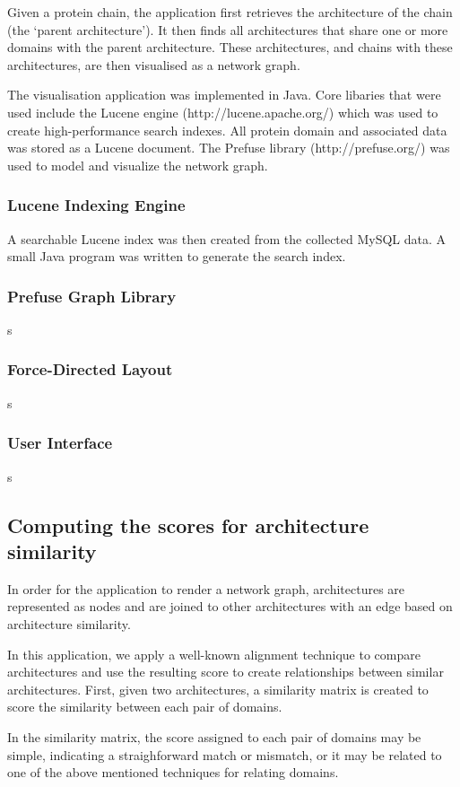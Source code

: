 Given a protein chain, the application first retrieves the architecture of the chain (the `parent architecture'). It then finds all architectures that share one or more domains with the parent architecture.  These architectures, and chains with these architectures, are then visualised as a network graph.

The visualisation application was implemented in Java. Core libaries that were used include the Lucene engine (http://lucene.apache.org/) which was used to create high-performance search indexes. All protein domain and associated data was stored as a Lucene document. The Prefuse library (http://prefuse.org/) was used to model and visualize the network graph.

\subsubsection{Lucene Indexing Engine}
A searchable Lucene index was then created from the collected MySQL data. A small Java program was written to generate the search index. 

\subsubsection{Prefuse Graph Library}
s
\subsubsection{Force-Directed Layout}
s
\subsubsection{User Interface}
s

\subsection{Computing the scores for architecture similarity}

In order for the application to render a network graph, architectures are represented as nodes and are joined to other architectures with an edge based on architecture similarity.

In this application, we apply a well-known alignment technique to compare architectures and use the resulting score to create relationships between similar architectures. First, given two architectures, a similarity matrix is created to score the similarity between each pair of domains. 

In the similarity matrix, the score assigned to each pair of domains may be simple, indicating a straighforward match or mismatch, or it may be related to one of the above mentioned techniques for relating domains.


